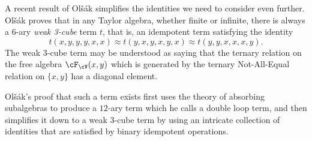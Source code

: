 \begin{rem} A recent result of Ol{\v{s}}{\'a}k simplifies the identities we need to consider even further. Ol{\v{s}}{\'a}k \cite{olsak-weak} proves that in any Taylor algebra, whether finite or infinite, there is always a $6$-ary \emph{weak 3-cube} term $t$, that is, an idempotent term satisfying the identity
\[
t(x,y,y,y,x,x) \approx t(y,x,y,x,y,x) \approx t(y,y,x,x,x,y).
\]
The weak 3-cube term may be understood as saying that the ternary relation on the free algebra $\cF_{\cV}(x,y)$ which is generated by the ternary Not-All-Equal relation on $\{x,y\}$ has a diagonal element.

Ol{\v{s}}{\'a}k's proof that such a term exists first uses the theory of absorbing subalgebras to produce a $12$-ary term which he calls a double loop term, and then simplifies it down to a weak $3$-cube term by using an intricate collection of identities that are satisfied by binary idempotent operations.
\end{rem}

